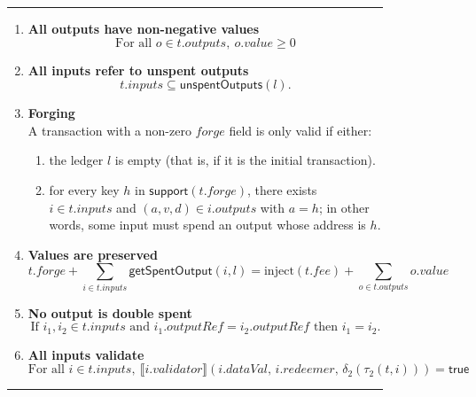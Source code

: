 \documentclass[a4paper]{article}
\newcommand{\msf}[1]{\ensuremath{\mathsf{#1}}}
\newcommand{\mi}[1]{\ensuremath{\mathit{#1}}}
\newcommand\rfskip{7pt}
\newenvironment{ruledfigure}[1]{\begin{figure}[#1]\hrule\vspace{\rfskip}}{\vspace{\rfskip}\hrule\end{figure}}
\newcommand{\true}{\textsf{true}}
\newcommand{\support}{\msf{support}}
\newcommand{\inputs}{\mi{inputs}}
\newcommand{\outputs}{\mi{outputs}}
\newcommand{\forge}{\mi{forge}}
\newcommand{\fee}{\mi{fee}}
\newcommand{\val}{\mi{value}}  %
\newcommand{\validator}{\mi{validator}}
\newcommand{\redeemer}{\mi{redeemer}}
\newcommand{\dataVal}{\mi{dataVal}}
\newcommand{\outputref}{\mi{outputRef}}
\newcommand{\getSpent}{\msf{getSpentOutput}}
\newcommand{\unspent}{\msf{unspentOutputs}}
\newcommand{\injectNative}{\ensuremath{\mathrm{inject}}}
\begin{document}
\begin{ruledfigure}{H}
\begin{enumerate}

\item
  \label{rule:all-outputs-are-non-negative-2}
  \textbf{All outputs have non-negative values}
  \begin{displaymath}
    \textrm{For all } o \in t.\outputs,\ o.\val \geq 0
  \end{displaymath}

\item
  \label{rule:all-inputs-refer-to-unspent-outputs-2}
  \textbf{All inputs refer to unspent outputs}
  \begin{displaymath}
    t.\inputs \subseteq \unspent(l).
  \end{displaymath}

\item
  \label{rule:forging-2}
  \textbf{Forging}\\
  A transaction with a non-zero \forge{} field is only
  valid if either:
  \begin{enumerate}
    \item the ledger $l$ is empty (that is, if it is the initial transaction).
    \item \label{rule:custom-forge}
      for every key $h$ in $\support(t.\forge)$, there
      exists $i \in t.\inputs$ and $(a,v,d) \in i.\outputs$ with
      $a =h$; in other words, some input must spend an output
      whose address is $h$.
  \end{enumerate}

\item
  \label{rule:value-is-preserved-2}
  \textbf{Values are preserved}
  \begin{displaymath}
    t.\forge + \sum_{i \in t.\inputs} \getSpent(i, l) = \injectNative(t.\fee) + \sum_{o \in t.\outputs} o.\val
  \end{displaymath}

\item
  \label{rule:no-double-spending-2}
  \textbf{No output is double spent}
  \begin{displaymath}
    \textrm{If } i_1, i_2 \in t.\inputs \textrm{ and }  i_1.\outputref = i_2.\outputref
    \textrm{ then } i_1 = i_2.
  \end{displaymath}

\item
  \label{rule:all-inputs-validate-2}
  \textbf{All inputs validate}
  \begin{displaymath}
    \textrm{For all } i \in t.\inputs,\ \llbracket
    i.\validator\rrbracket(i.\dataVal,\, i.\redeemer,\, \delta_2(\tau_2(t, i))) = \true
  \end{displaymath}


\end{enumerate}
\end{ruledfigure}
\end{document}
